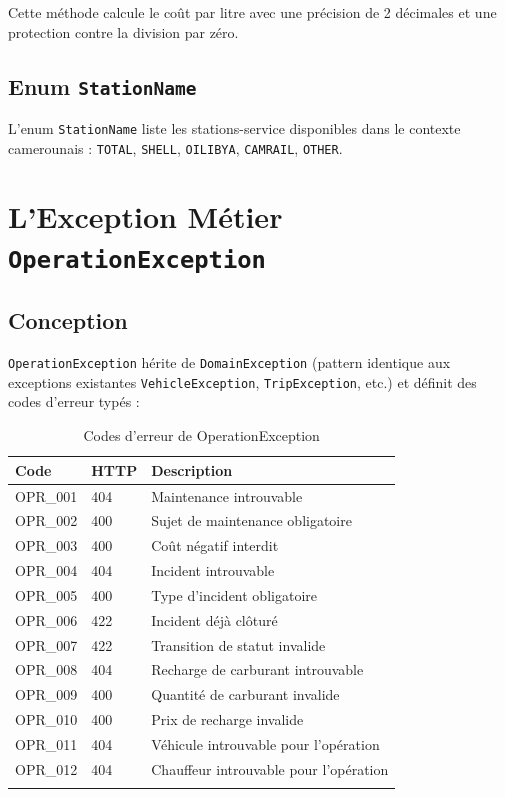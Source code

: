 \documentclass[12pt,a4paper]{report}
\begin{document}
Cette méthode calcule le coût par litre avec une précision de 2 décimales et une protection contre la division par zéro.

\subsection{Enum \texttt{StationName}}

L'enum \texttt{StationName} liste les stations-service disponibles dans le contexte camerounais : \texttt{TOTAL}, \texttt{SHELL}, \texttt{OILIBYA}, \texttt{CAMRAIL}, \texttt{OTHER}.

\section{L'Exception Métier \texttt{OperationException}}

\subsection{Conception}

\texttt{OperationException} hérite de \texttt{DomainException} (pattern identique aux exceptions existantes \texttt{VehicleException}, \texttt{TripException}, etc.) et définit des codes d'erreur typés :

\begin{longtable}{p{2cm}p{2.5cm}p{8cm}}
\toprule
\textbf{Code} & \textbf{HTTP} & \textbf{Description} \\
\midrule
\endhead
OPR\_001 & 404 & Maintenance introuvable \\
OPR\_002 & 400 & Sujet de maintenance obligatoire \\
OPR\_003 & 400 & Coût négatif interdit \\
OPR\_004 & 404 & Incident introuvable \\
OPR\_005 & 400 & Type d'incident obligatoire \\
OPR\_006 & 422 & Incident déjà clôturé \\
OPR\_007 & 422 & Transition de statut invalide \\
OPR\_008 & 404 & Recharge de carburant introuvable \\
OPR\_009 & 400 & Quantité de carburant invalide \\
OPR\_010 & 400 & Prix de recharge invalide \\
OPR\_011 & 404 & Véhicule introuvable pour l'opération \\
OPR\_012 & 404 & Chauffeur introuvable pour l'opération \\
\bottomrule
\caption{Codes d'erreur de OperationException}
\end{longtable}
\end{document}
